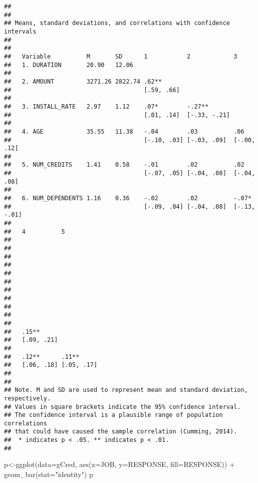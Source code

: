 \documentclass[
]{article}
\newenvironment{Shaded}{\begin{snugshade}}{\end{snugshade}}
\newcommand{\AttributeTok}[1]{\textcolor[rgb]{0.77,0.63,0.00}{#1}}
\newcommand{\FunctionTok}[1]{\textcolor[rgb]{0.00,0.00,0.00}{#1}}
\newcommand{\NormalTok}[1]{#1}
\newcommand{\OtherTok}[1]{\textcolor[rgb]{0.56,0.35,0.01}{#1}}
\newcommand{\SpecialCharTok}[1]{\textcolor[rgb]{0.00,0.00,0.00}{#1}}
\newcommand{\StringTok}[1]{\textcolor[rgb]{0.31,0.60,0.02}{#1}}
\begin{document}
\begin{verbatim}
## 
## 
## Means, standard deviations, and correlations with confidence intervals
##  
## 
##   Variable          M       SD      1           2            3           
##   1. DURATION       20.90   12.06                                        
##                                                                          
##   2. AMOUNT         3271.26 2822.74 .62**                                
##                                     [.59, .66]                           
##                                                                          
##   3. INSTALL_RATE   2.97    1.12    .07*        -.27**                   
##                                     [.01, .14]  [-.33, -.21]             
##                                                                          
##   4. AGE            35.55   11.38   -.04        .03          .06         
##                                     [-.10, .03] [-.03, .09]  [-.00, .12] 
##                                                                          
##   5. NUM_CREDITS    1.41    0.58    -.01        .02          .02         
##                                     [-.07, .05] [-.04, .08]  [-.04, .08] 
##                                                                          
##   6. NUM_DEPENDENTS 1.16    0.36    -.02        .02          -.07*       
##                                     [-.09, .04] [-.04, .08]  [-.13, -.01]
##                                                                          
##   4          5         
##                        
##                        
##                        
##                        
##                        
##                        
##                        
##                        
##                        
##                        
##                        
##   .15**                
##   [.09, .21]           
##                        
##   .12**      .11**     
##   [.06, .18] [.05, .17]
##                        
## 
## Note. M and SD are used to represent mean and standard deviation, respectively.
## Values in square brackets indicate the 95% confidence interval.
## The confidence interval is a plausible range of population correlations 
## that could have caused the sample correlation (Cumming, 2014).
##  * indicates p < .05. ** indicates p < .01.
## 
\end{verbatim}

\begin{Shaded}
\begin{Highlighting}[]
\NormalTok{p}\OtherTok{\textless{}{-}}\FunctionTok{ggplot}\NormalTok{(}\AttributeTok{data=}\NormalTok{gCred, }\FunctionTok{aes}\NormalTok{(}\AttributeTok{x=}\NormalTok{JOB, }\AttributeTok{y=}\NormalTok{RESPONSE, }\AttributeTok{fill=}\NormalTok{RESPONSE)) }\SpecialCharTok{+}
          \FunctionTok{geom\_bar}\NormalTok{(}\AttributeTok{stat=}\StringTok{"identity"}\NormalTok{)}
\NormalTok{p}
\end{Highlighting}
\end{Shaded}
\end{document}
